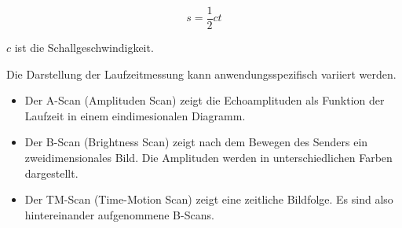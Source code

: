 \begin{equation}
  s = \frac{1}{2} c t
  \label{eqn:laufzeit}
\end{equation}

$c$ ist die Schallgeschwindigkeit.

Die Darstellung der Laufzeitmessung kann anwendungsspezifisch variiert werden.

\begin{itemize}
  \item Der A-Scan (Amplituden Scan) zeigt die Echoamplituden als Funktion der
  Laufzeit in einem eindimesionalen Diagramm.

  \item Der B-Scan (Brightness Scan) zeigt nach dem Bewegen des Senders ein
  zweidimensionales Bild. Die Amplituden werden in unterschiedlichen Farben dargestellt.

  \item Der TM-Scan (Time-Motion Scan) zeigt eine zeitliche Bildfolge. Es sind also hintereinander
  aufgenommene B-Scans.
\end{itemize}
